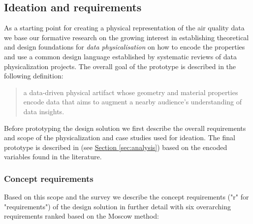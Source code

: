 \subsection{Ideation and requirements}

As a starting point for creating a physical representation of the air quality data we base our formative research on the growing interest in establishing theoretical and design foundations for \textit{data physicalisation} \cite{hornecker_design_2023, sauve_physecology_2022, bae_making_2022} on how to encode the properties and use a common design language \cite{ranasinghe_encoding_2023, sosa_data_2018} established by systematic reviews of data physicalization projects. The overall goal of the prototype is described in the following definition:

\begin{quote}
a data-driven physical artifact whose geometry and material properties encode data that aims to augment a nearby audience’s understanding of data insights.
\end{quote}

Before prototyping the design solution we first describe the overall requirements and scope of the physicalization and case studies used for ideation. The final prototype is described in (see \hyperref[sec:analysis]{Section \ref*{sec:analysis}}) based on the encoded variables found in the literature. 

\subsubsection{Concept requirements}

Based on this scope and the survey we describe the concept requirements ("r" for "requirements") of the design solution in further detail with six overarching requirements ranked based on the Moscow method:


